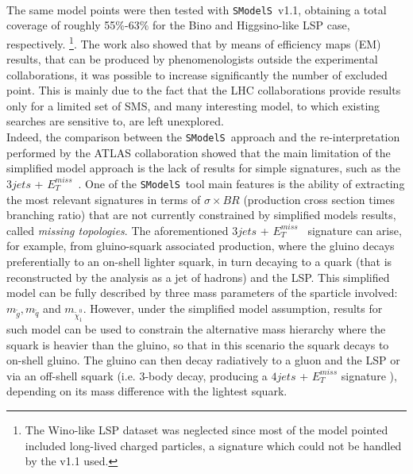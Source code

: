 \documentclass[preprint,number,sort&compress,twocolumn,3p]{elsstyarticle}
\newcommand{\MET}{{ $E_T ^{miss}$}}
\newcommand{\SMO}{\texttt{SModelS\xspace}}
\begin{document}
%
\\
The same model points were then tested with \SMO~v1.1\cite{Ambrogi:2017neo}, obtaining a total coverage of roughly 55$\%$-63$\%$ for the Bino and Higgsino-like LSP case, respectively. \footnote{The Wino-like LSP dataset was neglected since most of the model pointed included long-lived charged particles, a signature which could not be handled by the v1.1 used.}. The work also showed that by means of efficiency maps (EM) results, that can be produced by phenomenologists outside the experimental collaborations, it was possible to increase significantly the number of excluded point. This is mainly due to the fact that the LHC collaborations provide results only for a limited set of SMS, and many interesting model, to which existing searches are sensitive to, are left unexplored.
\\
Indeed, the comparison between the \SMO~approach and the re-interpretation performed by the ATLAS collaboration showed  that the main limitation of the simplified model approach is the lack of results for simple signatures, such as the $3jets$ +\MET~. One of the \SMO~tool main features is the ability of extracting the most relevant signatures in terms of $\sigma \times BR$ (production cross section  times branching ratio) that are not currently constrained by simplified models results, called \textit{missing topologies}. The aforementioned $3jets$ +\MET~ signature can arise, for example, from gluino-squark associated production, where the gluino decays preferentially to an on-shell lighter squark, in turn decaying to a quark (that is reconstructed by the analysis as a jet of hadrons) and the LSP. This simplified model can be fully described by three mass parameters of the sparticle involved: $m_{\tilde g}, m_{\tilde q}$ and $m_{\tilde \chi _1 ^0}$. However, under the simplified model assumption, results for such model can be used to constrain the alternative mass hierarchy where the squark is heavier than the gluino, so that in this scenario the squark decays to on-shell gluino. The gluino can then decay radiatively to a gluon and the LSP or via an off-shell squark (i.e. 3-body decay, producing a $4jets$ + $E_T ^{miss}$ signature ), depending on its mass difference with the lightest squark. 
\end{document}
